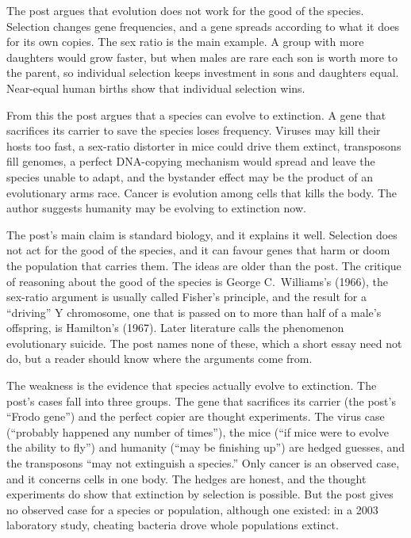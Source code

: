 \begin{afterword}
\summaryhead

The post argues that evolution does not work for the good of the species. Selection changes gene frequencies, and a gene spreads according to what it does for its own copies. The sex ratio is the main example. A group with more daughters would grow faster, but when males are rare each son is worth more to the parent, so individual selection keeps investment in sons and daughters equal. Near-equal human births show that individual selection wins.

From this the post argues that a species can evolve to extinction. A gene that sacrifices its carrier to save the species loses frequency. Viruses may kill their hosts too fast, a sex-ratio distorter in mice could drive them extinct, transposons fill genomes, a perfect DNA-copying mechanism would spread and leave the species unable to adapt, and the bystander effect may be the product of an evolutionary arms race. Cancer is evolution among cells that kills the body. The author suggests humanity may be evolving to extinction now.

\responsehead

The post's main claim is standard biology, and it explains it well. Selection does not act for the good of the species, and it can favour genes that harm or doom the population that carries them. The ideas are older than the post. The critique of reasoning about the good of the species is George C.~Williams's (1966), the sex-ratio argument is usually called Fisher's principle, and the result for a ``driving'' Y chromosome, one that is passed on to more than half of a male's offspring, is Hamilton's (1967). Later literature calls the phenomenon evolutionary suicide. The post names none of these, which a short essay need not do, but a reader should know where the arguments come from.

The weakness is the evidence that species actually evolve to extinction. The post's cases fall into three groups. The gene that sacrifices its carrier (the post's ``Frodo gene'') and the perfect copier are thought experiments. The virus case (``probably happened any number of times''), the mice (``if mice were to evolve the ability to fly'') and humanity (``may be finishing up'') are hedged guesses, and the transposons ``may not extinguish a species.'' Only cancer is an observed case, and it concerns cells in one body. The hedges are honest, and the thought experiments do show that extinction by selection is possible. But the post gives no observed case for a species or population, although one existed: in a 2003 laboratory study, cheating bacteria drove whole populations extinct.


\end{afterword}
